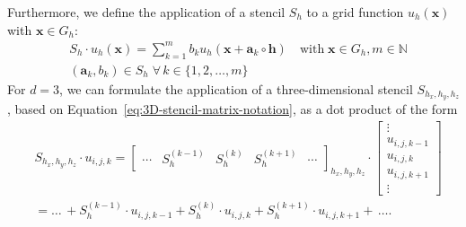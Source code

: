 Furthermore, we define the application of a stencil $S_h$ to a grid function $u_h(\bm x)$ with $\bm x \in G_h$:
\begin{equation}
	\begin{split}
		& S_h \cdot u_h(\bm{x}) = \sum_{k=1}^m b_k u_h({\bm x + \bm{a}_k} \circ \bm{h}) \quad 
		\text{with} \; \bm{x} \in G_h, m \in \mathbb{N} \\ & (\bm{a}_k, b_k) \in S_h \; \forall \, k \in \{ 1, 2, \dots, m \}
	\end{split}
\label{eq:stencil-application}
\end{equation}
For $d = 3$, we can formulate the application of a three-dimensional stencil $S_{h_x, h_y, h_z}$, based on Equation~\eqref{eq:3D-stencil-matrix-notation}, as a dot product of the form
\begin{equation}
	\begin{split}
	& S_{h_x, h_y, h_z} \cdot u_{i,j,k} = 	
	\begin{bmatrix}
	\cdots & S_{h}^{(k-1)} & S_{h}^{(k)} & S_{h}^{(k+1)} & \cdots 
	\end{bmatrix}_{h_x, h_y, h_z} \cdot
	\begin{bmatrix}
	\vdots \\ u_{i,j,k-1} \\ u_{i,j,k} \\ u_{i,j,k+1} \\ \vdots 
	\end{bmatrix} \\
	& = \dots \, + S_{h}^{(k-1)} \cdot u_{i,j,k-1} + S_{h}^{(k)} \cdot u_{i,j,k} + S_{h}^{(k+1)} \cdot u_{i,j,k+1} + \, \dots .
	\end{split}
\end{equation}

